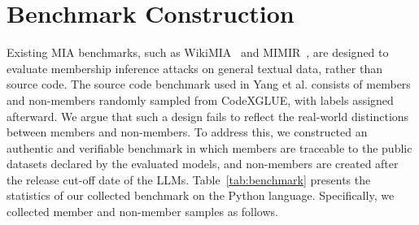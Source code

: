 
\section{Benchmark Construction}


Existing MIA benchmarks, such as WikiMIA~\cite{shi2023detecting} and MIMIR~\cite{duan2024membership}, are designed to evaluate membership inference attacks on general textual data, rather than source code.
The source code benchmark used in Yang et al.\cite{yang2024gotcha} consists of members and non-members randomly sampled from CodeXGLUE\cite{lu2021codexglue}, with labels assigned afterward. We argue that such a design fails to reflect the real-world distinctions between members and non-members. To address this, we constructed an authentic and verifiable benchmark in which members are traceable to the public datasets declared by the evaluated models, and non-members are created after the release cut-off date of the LLMs. Table~\ref{tab:benchmark} presents the statistics of our collected benchmark on the Python language. Specifically, we collected member and non-member samples as follows.




